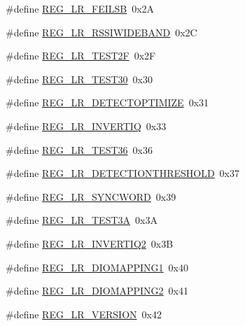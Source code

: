 \begin{DoxyCompactItemize}
\item 
\#define \mbox{\hyperlink{sx1276_regs-_lo_ra_8h_a515106b61bc60484b381cc58afa28b6e}{R\+E\+G\+\_\+\+L\+R\+\_\+\+F\+E\+I\+L\+SB}}~0x2A
\item 
\#define \mbox{\hyperlink{sx1276_regs-_lo_ra_8h_a98748f71ec5ffb1945bf8fa7a91a5d45}{R\+E\+G\+\_\+\+L\+R\+\_\+\+R\+S\+S\+I\+W\+I\+D\+E\+B\+A\+ND}}~0x2C
\item 
\#define \mbox{\hyperlink{sx1276_regs-_lo_ra_8h_af5f1829a69cb2a95243952ffa751a4c9}{R\+E\+G\+\_\+\+L\+R\+\_\+\+T\+E\+S\+T2F}}~0x2F
\item 
\#define \mbox{\hyperlink{sx1276_regs-_lo_ra_8h_a74451ab459bd0f482dde3ee50592390b}{R\+E\+G\+\_\+\+L\+R\+\_\+\+T\+E\+S\+T30}}~0x30
\item 
\#define \mbox{\hyperlink{sx1276_regs-_lo_ra_8h_a62883b6ca8e236af4d331a31e55c67b3}{R\+E\+G\+\_\+\+L\+R\+\_\+\+D\+E\+T\+E\+C\+T\+O\+P\+T\+I\+M\+I\+ZE}}~0x31
\item 
\#define \mbox{\hyperlink{sx1276_regs-_lo_ra_8h_afc2779efc44625851e1d056f48fa1f0c}{R\+E\+G\+\_\+\+L\+R\+\_\+\+I\+N\+V\+E\+R\+T\+IQ}}~0x33
\item 
\#define \mbox{\hyperlink{sx1276_regs-_lo_ra_8h_a08173e8721d25c6ab32e8aa4c157751d}{R\+E\+G\+\_\+\+L\+R\+\_\+\+T\+E\+S\+T36}}~0x36
\item 
\#define \mbox{\hyperlink{sx1276_regs-_lo_ra_8h_abc835e71071bd5f3bd52f54168d6e4b7}{R\+E\+G\+\_\+\+L\+R\+\_\+\+D\+E\+T\+E\+C\+T\+I\+O\+N\+T\+H\+R\+E\+S\+H\+O\+LD}}~0x37
\item 
\#define \mbox{\hyperlink{sx1276_regs-_lo_ra_8h_a9da3702bd320fa729cb809d07ef0c38a}{R\+E\+G\+\_\+\+L\+R\+\_\+\+S\+Y\+N\+C\+W\+O\+RD}}~0x39
\item 
\#define \mbox{\hyperlink{sx1276_regs-_lo_ra_8h_a4dd28b78370d8732b9d149f71826e62d}{R\+E\+G\+\_\+\+L\+R\+\_\+\+T\+E\+S\+T3A}}~0x3A
\item 
\#define \mbox{\hyperlink{sx1276_regs-_lo_ra_8h_a83e2628ed2b5dcf9d0a30e7317b9a560}{R\+E\+G\+\_\+\+L\+R\+\_\+\+I\+N\+V\+E\+R\+T\+I\+Q2}}~0x3B
\item 
\#define \mbox{\hyperlink{sx1276_regs-_lo_ra_8h_a153226eac782c0908150527e844dc42f}{R\+E\+G\+\_\+\+L\+R\+\_\+\+D\+I\+O\+M\+A\+P\+P\+I\+N\+G1}}~0x40
\item 
\#define \mbox{\hyperlink{sx1276_regs-_lo_ra_8h_a13a4beabb022493d7f714e49e44e1715}{R\+E\+G\+\_\+\+L\+R\+\_\+\+D\+I\+O\+M\+A\+P\+P\+I\+N\+G2}}~0x41
\item 
\#define \mbox{\hyperlink{sx1276_regs-_lo_ra_8h_a8161394887fc1ff67af883e55afa006e}{R\+E\+G\+\_\+\+L\+R\+\_\+\+V\+E\+R\+S\+I\+ON}}~0x42

\end{DoxyCompactItemize}
